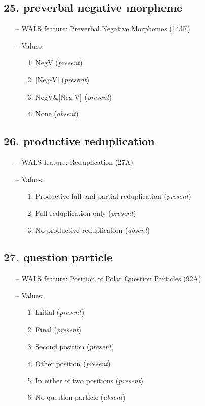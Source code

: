 \subsection*{25. preverbal negative morpheme}

\begin{itemize}
  \item[--] WALS feature: Preverbal Negative Morphemes (143E)
  \item[--] Values:
  {\small
  \begin{enumerate}
    \item[1:] NegV (\emph{present})
    \item[2:] [Neg-V] (\emph{present})
    \item[3:] NegV\&[Neg-V] (\emph{present})
    \item[4:] None (\emph{absent})
  \end{enumerate}
  }
\end{itemize}


\subsection*{26. productive reduplication}

\begin{itemize}
  \item[--] WALS feature: Reduplication (27A)
  \item[--] Values:
  {\small
  \begin{enumerate}
    \item[1:] Productive full and partial reduplication (\emph{present})
    \item[2:] Full reduplication only (\emph{present})
    \item[3:] No productive reduplication (\emph{absent})
  \end{enumerate}
  }
\end{itemize}


\subsection*{27. question particle}

\begin{itemize}
  \item[--] WALS feature: Position of Polar Question Particles (92A)
  \item[--] Values:
  {\small
  \begin{enumerate}
    \item[1:] Initial (\emph{present})
    \item[2:] Final (\emph{present})
    \item[3:] Second position (\emph{present})
    \item[4:] Other position (\emph{present})
    \item[5:] In either of two positions (\emph{present})
    \item[6:] No question particle (\emph{absent})
  \end{enumerate}
  }
\end{itemize}


